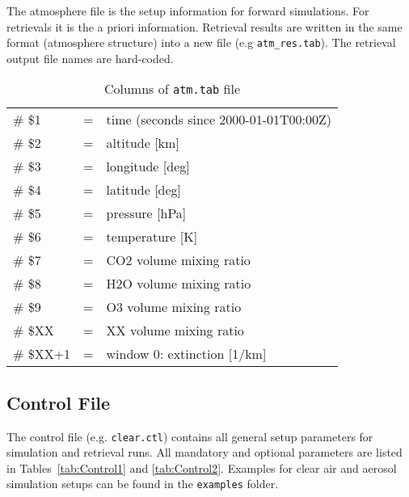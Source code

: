 The atmosphere file is the setup information for forward simulations. For retrievals it is the a priori information. Retrieval results are written in the same format (atmosphere structure) into a new file (e.g \texttt{atm\_res.tab}). The retrieval output file names are hard-coded.

\begin{table*}[!h]
\caption{Columns of \texttt{atm.tab} file}
\begin{tabular}{lcl}
\# \$1 & = & time (seconds since 2000-01-01T00:00Z) \\
\# \$2 & = & altitude [km] \\
\# \$3 & = & longitude [deg] \\
\# \$4 & = & latitude [deg] \\
\# \$5 & = & pressure [hPa] \\
\# \$6 & = & temperature [K] \\
\# \$7 & = & CO2 volume mixing ratio \\
\# \$8 & = & H2O volume mixing ratio \\
\# \$9 & = & O3 volume mixing ratio \\
\# \$XX   & = & XX volume mixing ratio \\
\# \$XX+1 & = & window 0: extinction [1/km] \\
\end{tabular}
\end{table*} 


\subsection{Control File}
\label{sec:ControlFile}
The control file (e.g. \texttt{clear.ctl}) contains all general setup parameters for simulation and retrieval runs. All mandatory and optional parameters are listed in Tables~\ref{tab:Control1} and \ref{tab:Control2}. Examples for clear air and aerosol simulation setups can be found in the \texttt{examples} folder.

